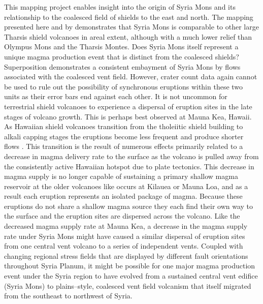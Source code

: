 This mapping project enables insight into the origin of Syria Mons and its relationship to the coalesced field of shields to the east and north.  The mapping presented here and by \citet{Baptista2008} demonstrates that Syria Mons is comparable to other large Tharsis shield volcanoes in areal extent, although with a much lower relief than Olympus Mons and the Tharsis Montes.  Does Syria Mons itself represent a unique magma production event that is distinct from the coalesced shields?  Superposition demonstrates a consistent embayment of Syria Mons by flows associated with the coalesced vent field.  However, crater count data again cannot be used to rule out the possibility of synchronous eruptions within these two units as their error bars end against each other. It is not uncommon for terrestrial shield volcanoes to experience a dispersal of eruption sites in the late stages of volcano growth.  This is perhaps best observed at Mauna Kea, Hawaii.  As Hawaiian shield volcanoes transition from the tholeiitic shield building to alkali capping stages the eruptions become less frequent and produce shorter flows \citep{Moore2007,Wolfe1996,Rowland2000,Bleacher2008}.  This transition is the result of numerous effects primarily related to a decrease in magma delivery rate to the surface as the volcano is pulled away from the consistently active Hawaiian hotspot due to plate tectonics.  This decrease in magma supply is no longer capable of sustaining a primary shallow magma reservoir at the older volcanoes like occurs at Kilauea or Mauna Loa, and as a result each eruption represents an isolated package of magma.  Because these eruptions do not share a shallow magma source they each find their own way to the surface and the eruption sites are dispersed across the volcano. Like the decreased magma supply rate at Mauna Kea, a decrease in the magma supply rate under Syria Mons might have caused a similar dispersal of eruption sites from one central vent volcano to a series of independent vents. Coupled with changing regional stress fields that are displayed by different fault orientations throughout Syria Planum, it might be possible for one major magma production event under the Syria region to have evolved from a sustained central vent edifice (Syria Mons) to plains--style, coalesced vent field volcanism that itself migrated from the southeast to northwest of Syria.  

